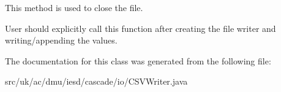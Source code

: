 This method is used to close the file. 

User should explicitly call this function after creating the file writer and writing/appending the values. 

The documentation for this class was generated from the following file\-:\begin{DoxyCompactItemize}
\item 
src/uk/ac/dmu/iesd/cascade/io/C\-S\-V\-Writer.\-java\end{DoxyCompactItemize}
